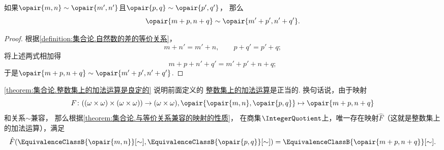 \begin{lemma}\label{theorem:集合论.整数集上的加法运算是良定的}
如果\(\opair{m,n}\sim\opair{m',n'}\)且\(\opair{p,q}\sim\opair{p',q'}\)，
那么\begin{equation*}
	\opair{m+p,n+q}\sim\opair{m'+p',n'+q'}.
\end{equation*}
\begin{proof}
根据\cref{definition:集合论.自然数的差的等价关系}，
\begin{equation*}
	m+n'=m'+n, \qquad
	p+q'=p'+q;
\end{equation*}
将上述两式相加得\begin{equation*}
	m+p+n'+q'=m'+p'+n+q;
\end{equation*}
于是\(\opair{m+p,n+q}\sim\opair{m'+p',n'+q'}\).
\end{proof}
\end{lemma}
\cref{theorem:集合论.整数集上的加法运算是良定的} 说明前面定义的%
\hyperref[equation:集合论.整数集上的加法运算]{整数集上的加法运算}是正当的.
换句话说，由于映射\begin{equation*}
	F\colon ((\omega\times\omega)\times(\omega\times\omega))\to(\omega\times\omega),
	\opair{\opair{m,n},\opair{p,q}} \mapsto \opair{m+p,n+q}
\end{equation*}和关系\(\sim\)兼容，
那么根据\cref{theorem:集合论.与等价关系兼容的映射的性质}，
在商集\(\IntegerQuotient\)上，唯一存在映射\(\hat{F}\)（这就是整数集上的加法运算），满足\begin{equation*}
	\hat{F}(\EquivalenceClassB{\opair{m,n}}[\sim],\EquivalenceClassB{\opair{p,q}}[\sim]) = \EquivalenceClassB{\opair{m+p,n+q}}[\sim].
\end{equation*}

